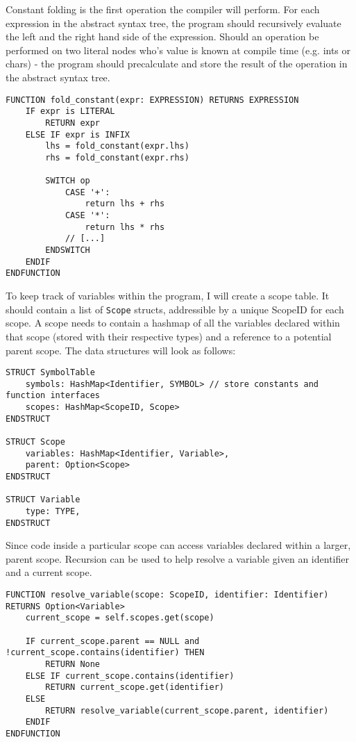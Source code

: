 Constant folding is the first operation the compiler will perform. For each expression in the abstract syntax tree, the program should recursively evaluate the left and the right hand side of the expression. Should an operation be performed on two literal nodes who's value is known at compile time (e.g. ints or chars) - the program should precalculate and store the result of the operation in the abstract syntax tree. 

\begin{lstlisting}
FUNCTION fold_constant(expr: EXPRESSION) RETURNS EXPRESSION
    IF expr is LITERAL 
        RETURN expr
    ELSE IF expr is INFIX 
        lhs = fold_constant(expr.lhs)
        rhs = fold_constant(expr.rhs)

        SWITCH op 
            CASE '+':
                return lhs + rhs
            CASE '*':
                return lhs * rhs
            // [...]
        ENDSWITCH 
    ENDIF
ENDFUNCTION
\end{lstlisting}

To keep track of variables within the program, I will create a scope table. It should contain a list of \texttt{Scope} structs, addressible by a unique ScopeID for each scope. A scope needs to contain a hashmap of all the variables declared within that scope (stored with their respective types) and a reference to a potential parent scope. The data structures will look as follows:

\begin{lstlisting}
STRUCT SymbolTable
    symbols: HashMap<Identifier, SYMBOL> // store constants and function interfaces
    scopes: HashMap<ScopeID, Scope>
ENDSTRUCT

STRUCT Scope 
    variables: HashMap<Identifier, Variable>,
    parent: Option<Scope>
ENDSTRUCT

STRUCT Variable 
    type: TYPE,
ENDSTRUCT
\end{lstlisting}

Since code inside a particular scope can access variables declared within a larger, parent scope. Recursion can be used to help resolve a variable given an identifier and a current scope. 

\begin{lstlisting}
FUNCTION resolve_variable(scope: ScopeID, identifier: Identifier) RETURNS Option<Variable>
    current_scope = self.scopes.get(scope)

    IF current_scope.parent == NULL and !current_scope.contains(identifier) THEN
        RETURN None
    ELSE IF current_scope.contains(identifier)
        RETURN current_scope.get(identifier)
    ELSE 
        RETURN resolve_variable(current_scope.parent, identifier)
    ENDIF
ENDFUNCTION
\end{lstlisting}

